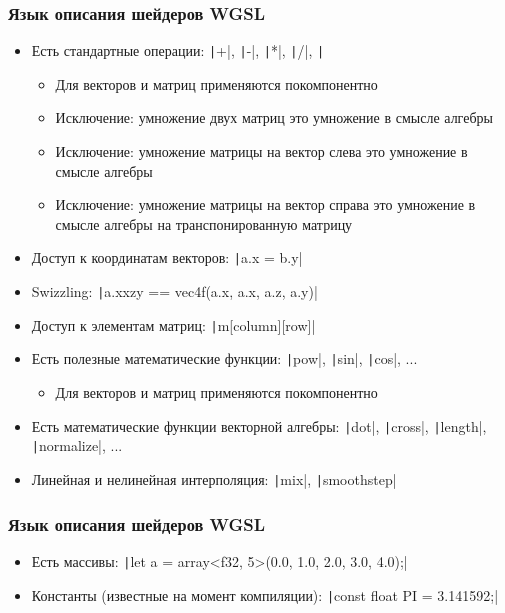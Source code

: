 \documentclass[10pt]{beamer}
\begin{document}
\begin{frame}[fragile]
\frametitle{Язык описания шейдеров WGSL}
\begin{itemize}
\item Есть стандартные операции: \texttt|+|, \texttt|-|, \texttt|*|, \texttt|/|, \texttt|%
\pause
\begin{itemize}
\item Для векторов и матриц применяются покомпонентно
\pause
\item Исключение: умножение двух матриц это умножение в смысле алгебры
\pause
\item Исключение: умножение матрицы на вектор слева это умножение в смысле алгебры
\pause
\item Исключение: умножение матрицы на вектор справа это умножение в смысле алгебры на транспонированную матрицу
\end{itemize}
\pause
\item Доступ к координатам векторов: \texttt|a.x = b.y|
\pause
\item Swizzling: \texttt|a.xxzy == vec4f(a.x, a.x, a.z, a.y)|
\pause
\item Доступ к элементам матриц: \texttt|m[column][row]|
\pause
\item Есть полезные математические функции: \texttt|pow|, \texttt|sin|, \texttt|cos|, ...
\pause
\begin{itemize}
\item Для векторов и матриц применяются покомпонентно
\end{itemize}
\pause
\item Есть математические функции векторной алгебры: \texttt|dot|, \texttt|cross|, \texttt|length|, \texttt|normalize|, ...
\pause
\item Линейная и нелинейная интерполяция: \texttt|mix|, \texttt|smoothstep|
\end{itemize}
\end{frame}

\begin{frame}[fragile]
\frametitle{Язык описания шейдеров WGSL}
\begin{itemize}
\item Есть массивы: \texttt|let a = array<f32, 5>(0.0, 1.0, 2.0, 3.0, 4.0);|
\pause
\item Константы (известные на момент компиляции): \texttt|const float PI = 3.141592;|
\end{itemize}
\end{frame}
\end{document}

